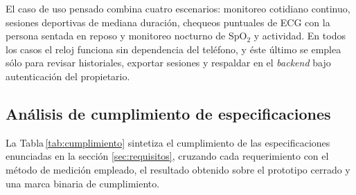 \documentclass[letterpaper,11pt]{article}
\newcommand{\rtabla}[1]{Tabla\,\ref{#1}}
\begin{document}
El caso de uso pensado combina cuatro escenarios: monitoreo cotidiano continuo, sesiones deportivas de mediana duraci\'on, chequeos puntuales de ECG con la persona sentada en reposo y monitoreo nocturno de SpO$_2$ y actividad. En todos los casos el reloj funciona sin dependencia del tel\'efono, y \'este \'ultimo se emplea s\'olo para revisar historiales, exportar sesiones y respaldar en el \textit{backend} bajo autenticaci\'on del propietario.

\subsection{An\'alisis de cumplimiento de especificaciones}\label{sec:cumplimiento}

La \rtabla{tab:cumplimiento} sintetiza el cumplimiento de las especificaciones enunciadas en la secci\'on \ref{sec:requisitos}, cruzando cada requerimiento con el m\'etodo de medici\'on empleado, el resultado obtenido sobre el prototipo cerrado y una marca binaria de cumplimiento.
\end{document}
